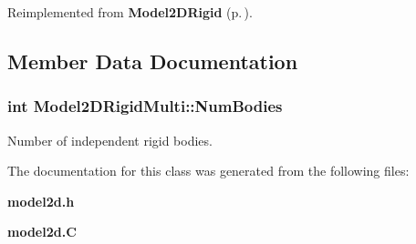 Reimplemented from {\bf Model2DRigid} {\rm (p.\,\pageref{classModel2DRigid_a6})}.

\subsection{Member Data Documentation}
\subsubsection{\setlength{\rightskip}{0pt plus 5cm}int Model2DRigid\-Multi::Num\-Bodies}\label{classModel2DRigidMulti_m0}


Number of independent rigid bodies.



The documentation for this class was generated from the following files:\begin{CompactItemize}
\item 
{\bf model2d.h}\item 
{\bf model2d.C}\end{CompactItemize}
